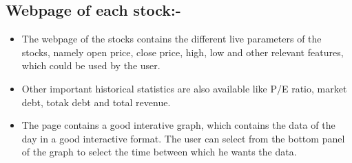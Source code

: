 \documentclass[11pt]{article}
\begin{document}
\subsection{Webpage of each stock:-}
\begin{itemize}
    \item The webpage of the stocks contains the different live parameters of the stocks, namely open price, close price, high, low and other relevant features, which could be used by the user.
    \item Other important historical statistics are also available like P/E ratio, market debt, totak debt and total revenue.
    \item The page contains a good interative graph, which contains the data of the day in a good interactive format. The user can select from the bottom panel of the graph to select the time between which he wants the data.
\end{itemize}
\end{document}
